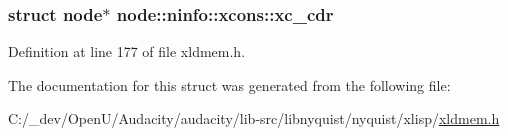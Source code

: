 \subsubsection[{\texorpdfstring{xc\+\_\+cdr}{xc_cdr}}]{\setlength{\rightskip}{0pt plus 5cm}struct {\bf node}$\ast$ node\+::ninfo\+::xcons\+::xc\+\_\+cdr}\hypertarget{structnode_1_1ninfo_1_1xcons_a97ea0e684b1deb96bda20bdc9539aac7}{}\label{structnode_1_1ninfo_1_1xcons_a97ea0e684b1deb96bda20bdc9539aac7}


Definition at line 177 of file xldmem.\+h.



The documentation for this struct was generated from the following file\+:\begin{DoxyCompactItemize}
\item 
C\+:/\+\_\+dev/\+Open\+U/\+Audacity/audacity/lib-\/src/libnyquist/nyquist/xlisp/\hyperlink{xldmem_8h}{xldmem.\+h}\end{DoxyCompactItemize}
